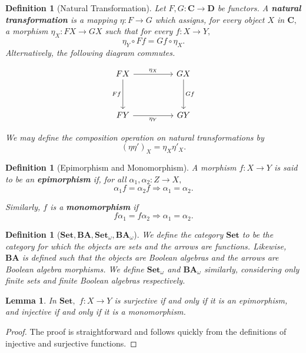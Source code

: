 \documentclass{article}
\newtheorem{lemma}[proposition]{Lemma}
\newtheorem{definition}[proposition]{Definition}
\numberwithin{equation}{section}
\newcommand{\cat}[1]{{\mathbf{#1}}}
\begin{document}
\begin{definition}[Natural Transformation]
Let $F, G : \cat{C} \to \cat{D}$ be functors. A \textbf{natural transformation} is a mapping $\eta : F \to G$ which assigns, for every object $X$ in $\cat{C},$ a morphism $\eta_X : FX \to GX$ such that for every $f : X \to Y,$ $$\eta_Y \circ Ff = Gf \circ \eta_X.$$ Alternatively, the following diagram commutes.

$$
\begin{tikzcd}
	FX && GX \\
	\\
	FY && GY
	\arrow["{\eta_X}", from=1-1, to=1-3]
	\arrow["{Ff}"', from=1-1, to=3-1]
	\arrow["{Gf}", from=1-3, to=3-3]
	\arrow["{\eta_Y}"', from=3-1, to=3-3]
\end{tikzcd}
$$

We may define the composition operation on natural transformations by $$(\eta\eta')_X = \eta_X\eta'_X.$$
\end{definition}

\begin{definition}[Epimorphism and  Monomorphism]
A morphism $f : X \to Y$ is said to be an \textbf{epimorphism} if, for all $\alpha_1, \alpha_2 : Z \to X,$ $$\alpha_1f = \alpha_2f \Rightarrow \alpha_1 = \alpha_2.$$

Similarly, $f$ is a \textbf{monomorphism} if $$f\alpha_1 = f\alpha_2 \Rightarrow \alpha_1 = \alpha_2.$$
\end{definition}

\begin{definition}[$\cat{Set}, \cat{BA}, \cat{Set}_\omega, \cat{BA}_\omega$]
We define the category $\cat{Set}$ to be the category for which the objects are sets and the arrows are functions. Likewise, $\cat{BA}$ is defined such that the objects are Boolean algebras and the arrows are Boolean algebra morphisms. We define $\cat{Set}_\omega$ and $\cat{BA}_\omega$ similarly, considering only finite sets and finite Boolean algebras respectively.
\end{definition}

\begin{lemma}
In $\cat{Set},$ $f : X \to Y$ is surjective if and only if it is an epimorphism, and injective if and only if it is a monomorphism.
\end{lemma}

\begin{proof}
The proof is straightforward and follows quickly from the definitions of injective and surjective functions.
\end{proof}
\end{document}
